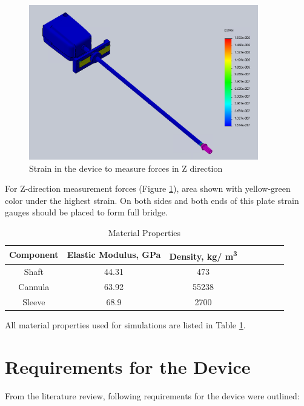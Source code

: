 \begin{figure}[h]
	\begin{center}
		\includegraphics[width=100mm]{fig/methods/z_dir_sim.png}
	\end{center}
	\vspace{-4mm}
	\caption[Z device]
	{Strain in the device to measure forces in Z direction}
	\label{fig:Zdev}
	\vspace{-2mm}
\end{figure}

For Z-direction measurement forces (Figure \ref{fig:Zdev}), area shown with yellow-green color under the highest strain. On both sides and both ends of this plate strain gauges should be placed to form full bridge.

\begin{table}
\caption {Material Properties} \label{tab:matProp} 
\begin{center}
\begin{tabular}{ | c | c | c | c | c | c | c | c | } 
\hline
Component & Elastic Modulus, GPa & Density, kg/ m\textsuperscript{3} \\ 
\hline
Shaft & 44.31 & 473\\ 
\hline
Cannula & 63.92 & 55238 \\ 
\hline
Sleeve & 68.9 & 2700  \\ 
\hline
\end{tabular}
\end{center}
\end{table}

All material properties used for simulations are listed in Table \ref{tab:matProp}.

\section{Requirements for the Device}
	\label{sec:DevReq}
	From the literature review, following requirements for the device were outlined:
	
